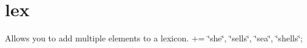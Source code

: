 \hypertarget{lex-example}{}\section{lex}
Allows you to add multiple elements to a lexicon. += \char`\"{}she\char`\"{}, \char`\"{}sells\char`\"{}, \char`\"{}sea\char`\"{}, \char`\"{}shells\char`\"{};


\begin{DoxyCodeInclude}
\end{DoxyCodeInclude}
 